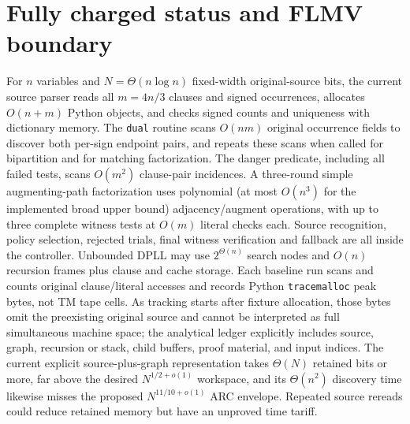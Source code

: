 \documentclass[11pt]{article}
\begin{document}
\section{Fully charged status and FLMV boundary}
For $n$ variables and $N=\Theta(n\log n)$ fixed-width original-source bits, the current source parser reads all $m=4n/3$ clauses and signed occurrences, allocates $O(n+m)$ Python objects, and checks signed counts and uniqueness with dictionary memory. The \texttt{dual} routine scans $O(nm)$ original occurrence fields to discover both per-sign endpoint pairs, and repeats these scans when called for bipartition and for matching factorization. The danger predicate, including all failed tests, scans $O(m^2)$ clause-pair incidences. A three-round simple augmenting-path factorization uses polynomial (at most $O(n^3)$ for the implemented broad upper bound) adjacency/augment operations, with up to three complete witness tests at $O(m)$ literal checks each. Source recognition, policy selection, rejected trials, final witness verification and fallback are all inside the controller. Unbounded DPLL may use $2^{\Theta(n)}$ search nodes and $O(n)$ recursion frames plus clause and cache storage. Each baseline run scans and counts original clause/literal accesses and records Python \texttt{tracemalloc} peak bytes, not TM tape cells. As tracking starts after fixture allocation, those bytes omit the preexisting original source and cannot be interpreted as full simultaneous machine space; the analytical ledger explicitly includes source, graph, recursion or stack, child buffers, proof material, and input indices. The current explicit source-plus-graph representation takes $\Theta(N)$ retained bits or more, far above the desired $N^{1/2+o(1)}$ workspace, and its $\Theta(n^2)$ discovery time likewise misses the proposed $N^{11/10+o(1)}$ ARC envelope. Repeated source rereads could reduce retained memory but have an unproved time tariff.
\end{document}
